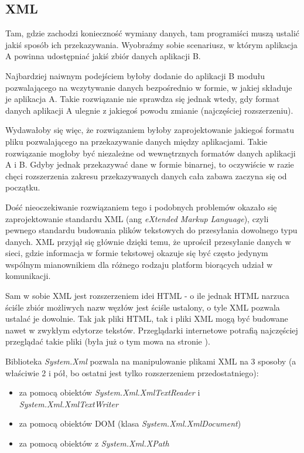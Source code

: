 ﻿\subsection{XML}
\label{section_XML}

Tam, gdzie zachodzi konieczność wymiany danych, tam programiści muszą ustalić jakiś sposób 
ich przekazywania. Wyobraźmy sobie scenariusz, w którym aplikacja A powinna udostępniać jakiś
zbiór danych aplikacji B.

Najbardziej naiwnym podejściem byłoby dodanie do aplikacji B modułu pozwalającego na wczytywanie
danych bezpośrednio w formie, w jakiej składuje je aplikacja A. Takie rozwiązanie nie sprawdza się
jednak wtedy, gdy format danych aplikacji A ulegnie z jakiegoś powodu zmianie (najczęściej rozszerzeniu).

Wydawałoby się więc, że rozwiązaniem byłoby zaprojektowanie jakiegoś formatu pliku pozwalającego
na przekazywanie danych między aplikacjami. Takie rozwiązanie mogłoby być niezależne od wewnętrznych
formatów danych aplikacji A i B. Gdyby jednak przekazywać dane w formie binarnej, to oczywiście w razie
chęci rozszerzenia zakresu przekazywanych danych cała zabawa zaczyna się od początku.

Dość nieoczekiwanie rozwiązaniem tego i podobnych problemów okazało się zaprojektowanie
standardu XML (ang {\em eXtended Markup Language}), czyli pewnego standardu budowania plików
tekstowych do przesyłania dowolnego typu danych. XML przyjął się głównie dzięki temu, że 
uprościł przesyłanie danych w sieci, gdzie informacja w formie tekstowej okazuje się być często
jedynym wspólnym mianownikiem dla różnego rodzaju platform biorących udział w komunikacji.

Sam w sobie XML jest rozszerzeniem idei HTML - o ile jednak HTML narzuca ściśle zbiór możliwych nazw
węzłów jest ściśle ustalony, o tyle XML pozwala ustalać je dowolnie. Tak jak pliki HTML, tak i pliki XML
mogą być budowane nawet w zwykłym edytorze tekstów. Przeglądarki internetowe potrafią najczęściej przeglądać
takie pliki (była już o tym mowa na stronie \pageref{dokumentowanieKodu}).

Biblioteka {\em System.Xml} pozwala na manipulowanie plikami XML na 3 sposoby (a właściwie 2 i pół, bo
ostatni jest tylko rozszerzeniem przedostatniego): 
\begin{itemize}
\item za pomocą obiektów {\em System.Xml.XmlTextReader} i {\em System.Xml.XmlTextWriter}
\item za pomocą obiektów DOM (klasa {\em System.Xml.XmlDocument})
\item za pomocą obiektów z {\em System.Xml.XPath} 
\end{itemize}

